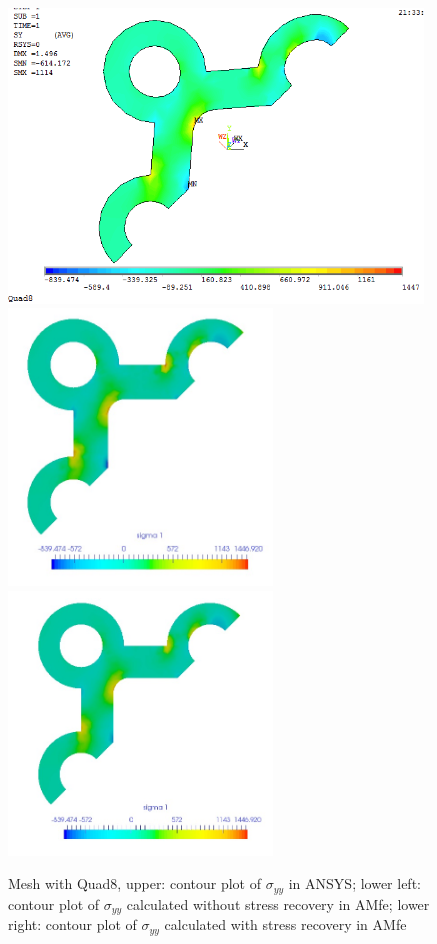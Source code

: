 \begin{figure}[htbp]
	\begin{center}
		\includegraphics[width=11cm,clip]{Quad8_Syy.png} 	
		\includegraphics[width=7cm,clip]{Quad8_Syy_PD.png} 		
		\includegraphics[width=7cm,clip]{Quad8_Syy_P.png} 		
		\caption{Mesh with Quad8, upper: contour plot of $\sigma_{yy}$ in ANSYS; lower left: contour plot of $\sigma_{yy}$ calculated without stress recovery in AMfe; lower right: contour plot of $\sigma_{yy}$ calculated with stress recovery in AMfe} \label{fig: Quad8_Syy}
	\end{center}
\end{figure}
\clearpage 

